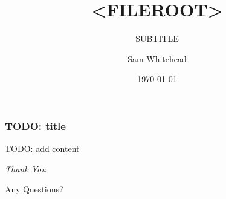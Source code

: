 \documentclass{beamer}
\title{<FILEROOT>}
\subtitle{SUBTITLE}
\author{Sam Whitehead}
\date{\today}
\begin{document}
\frame{\titlepage}

\begin{frame}
    \frametitle{TODO: title}

    TODO: add content
\end{frame}

\begin{frame}
    \centering \Huge
    \emph{Thank You}

    \vfill \Large
    Any Questions?
\end{frame}
\end{document}
